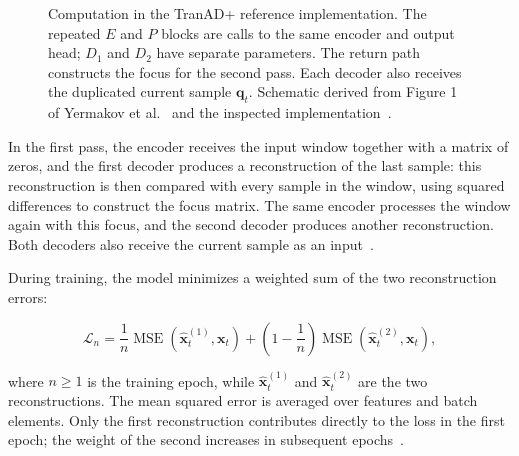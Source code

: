 \begin{figure}[htbp]
  \caption{Computation in the TranAD+ reference implementation.
  The repeated \(E\) and \(P\) blocks are calls to the same encoder and
  output head; \(D_1\) and \(D_2\) have separate parameters. The return
  path constructs the focus for the second pass. Each decoder also
  receives the duplicated current sample \(\mathbf{q}_t\). Schematic
  derived from Figure 1 of Yermakov et al.~\cite{Yermakov2025TranADPlus}
  and the inspected implementation~\cite{TranADPlusReferenceCode}.}
  \label{fig:background-tranadplus-flow}
\end{figure}

In the first pass, the encoder receives the input window together
with a matrix of zeros, and the first decoder produces a
reconstruction of the last sample: this reconstruction is then
compared with every sample in the window, using squared differences
to construct the focus matrix. The same encoder processes the
window again with this focus, and the second decoder produces
another reconstruction. Both decoders also receive the current
sample as an input~\cite{TranADPlusReferenceCode}.

During training, the model minimizes a weighted sum of the two
reconstruction errors:

\begin{equation}
  \mathcal{L}_{n} =
  \frac{1}{n}\operatorname{MSE}
  \left(\widehat{\mathbf{x}}^{(1)}_t,\mathbf{x}_t\right)
  +
  \left(1-\frac{1}{n}\right)\operatorname{MSE}
  \left(\widehat{\mathbf{x}}^{(2)}_t,\mathbf{x}_t\right),
  \label{eq:background-tranadplus-loss}
\end{equation}

where $n\geq1$ is the training epoch, while
$\widehat{\mathbf{x}}^{(1)}_t$ and
$\widehat{\mathbf{x}}^{(2)}_t$ are the two reconstructions.
The mean squared error is averaged over features and batch
elements. Only the first reconstruction contributes directly
to the loss in the first epoch; the weight of the second
increases in subsequent epochs~\cite{TranADPlusReferenceCode}.

